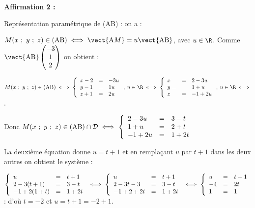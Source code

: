 \textbf{Affirmation 2 :}


Représentation paramétrique de (AB) : on a :

$M(x~;~y~;~z) \in (\text{AB}) \iff \vect{\text{A}M} = u\vect{\text{AB}}$, avec $u \in \R$.
Comme $\vect{\text{AB}}\begin{pmatrix}-3\\1\\2\end{pmatrix}$ on obtient :

$M(x~;~y~;~z) \in (\text{AB}) \iff \left\{\begin{array}{l c l}
x - 2 &=& -3u\\
y - 1&=&1u\\
z + 1 &=&2u
\end{array}\right., \: u \in \R \iff \left\{\begin{array}{l c l}
x &=& 2  -3u\\
y =& &1 + u\\
z &=&- 1 + 2u
\end{array}\right., \: u \in \R \iff$.

Donc $M(x~;~y~;~z) \in (\text{AB}) \cap \mathcal{D} \iff \left\{\begin{array}{l c l}
2 - 3u	&=&3 - t\\
1 + u	&=&2 + t\\
- 1 + 2u&=&1 + 2t
\end{array}\right.$

La deuxième équation donne $u = t + 1$ et  en remplaçant $u$ par $t + 1$ dans les deux autres on obtient le système :

$\left\{\begin{array}{l c l}
u 				&=& t + 1\\
2 - 3(t + 1) 	&=& 3 - t\\
- 1 + 2(1 + t) 	&=&1 + 2t
\end{array}\right. \iff \left\{\begin{array}{l c l}
u 				&=& t + 1\\
2 - 3t - 3 		&=& 3 - t\\
- 1 + 2 + 2t 	&=&1 + 2t
\end{array}\right.\iff
\left\{\begin{array}{l c l}
u 	&=& t + 1\\
- 4	&=& 2t\\
1 	&=& 1
\end{array}\right.$ : d'où $t = - 2$ et $u = t + 1 = - 2 + 1$.

